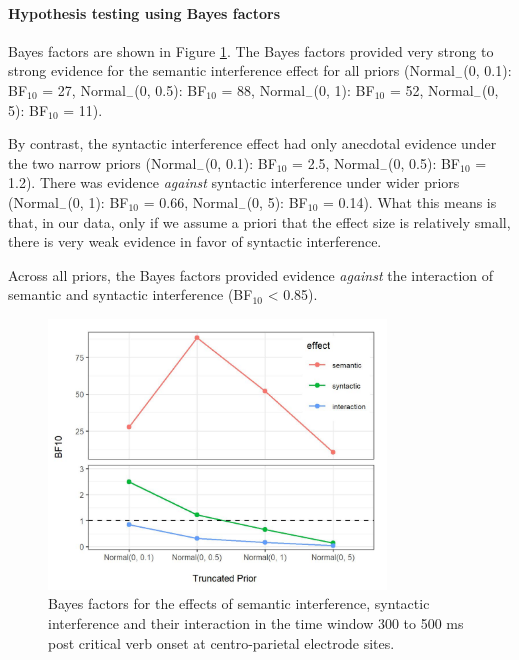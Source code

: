 \documentclass[a4paper, man, floatsintext]{apa7}
\begin{document}
\paragraph{Hypothesis testing using Bayes factors}

Bayes factors are shown in Figure \ref{fig:eeg_bfs}. The Bayes factors provided very strong to strong evidence for the semantic interference effect for all priors 
(Normal$_{-}$(0, 0.1): BF$_{10}$ = 27,
Normal$_{-}$(0, 0.5): BF$_{10}$ = 88,
Normal$_{-}$(0, 1): BF$_{10}$ = 52,
Normal$_{-}$(0, 5): BF$_{10}$ = 11). 

By contrast, the syntactic interference effect had only anecdotal evidence  under the two narrow priors (Normal$_{-}$(0, 0.1): BF$_{10}$ = 2.5,
Normal$_{-}$(0, 0.5): BF$_{10}$ = 1.2). There was evidence \textit{against} syntactic interference under wider priors 
(Normal$_{-}$(0, 1): BF$_{10}$ = 0.66,
Normal$_{-}$(0, 5): BF$_{10}$ = 0.14).  What this means is that, in our data, only if we assume a priori that the effect size is relatively small, there is very weak evidence in favor of syntactic interference.

Across all priors, the Bayes factors provided evidence \textit{against} the interaction of semantic and syntactic interference (BF$_{10}$ < 0.85).

\begin{figure}[H]
    \caption{Bayes factors for the effects of semantic interference, syntactic interference and their interaction in the time window 300 to 500 ms post critical verb onset at centro-parietal electrode sites.}
    \label{fig:eeg_bfs}
    \centering
    \includegraphics[width=0.8\textwidth]{paper/images/BF_plot_N103_cp_300_500.jpg}
\end{figure}
\end{document}
